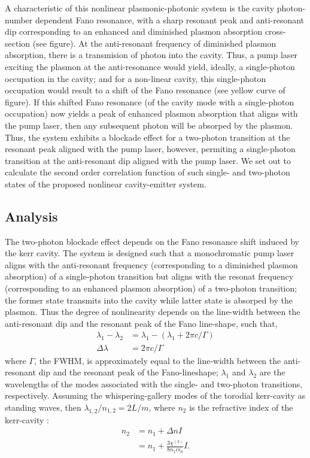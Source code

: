 \documentclass[12pt]{article}
\begin{document}
A characteristic of this nonlinear plasmonic-photonic system is the cavity photon-number 
dependent Fano resonance, with a sharp resonant peak and anti-resonant dip corresponding 
to an enhanced and diminished plasmon absorption cross-section (see figure). At the 
anti-resonant frequency of diminished plasmon absorption, there is a transmision of 
photon into the cavity. Thus, a pump laser exciting the plasmon at the anti-resonance 
would yield, ideally, a single-photon occupation in the cavity; and for a non-linear 
cavity, this single-photon occupation would result to a shift of the Fano resonance
(see yellow curve of figure). If this shifted Fano resonance (of the cavity mode with 
a single-photon occupation) now yields a peak of enhanced plasmon absorption that aligns 
with the pump laser, then any subsequent photon will be absorped by the plasmon. Thus, 
the system exhibits a blockade effect for a two-photon transition at the resonant peak
aligned with the pump laser, however, permiting a single-photon transition at the 
anti-resonant dip aligned with the pump laser. We set out to calculate the second order 
correlation function of such single- and two-photon states of the proposed nonlinear 
cavity-emitter system.

\subsection{Analysis}
The two-photon blockade effect depends on the Fano resonance shift induced by the kerr 
cavity. The system is designed such that a monochromatic pump laser aligns with the 
anti-resonant frequency (corresponding to a diminished plasmon absorption) of a 
single-photon transition but aligns with the resonat frequency (corresponding to an 
enhanced plasmon absorption) of a two-photon transition; the former state transmits into 
the cavity while latter state is absorped by the plasmon. Thus the degree of nonlinearity 
depends on the line-width between the anti-resonant dip and the resonant peak of the 
Fano line-shape, such that,
\begin{equation}
\begin{split}
\lambda_1 - \lambda_2 &= \lambda_1 - (\lambda_1 + 2\pi c / \Gamma )
\\
\Delta\lambda &= 2\pi c / \Gamma
\end{split}
\end{equation}
where $\Gamma$, the FWHM, is approximately equal to the line-width between the 
anti-resonant dip and the resonant peak of the Fano-lineshape; $\lambda_1$ and 
$\lambda_2$ are the wavelengths of the modes associated with the single- and two-photon
transitions, respectively.  Assuming the whispering-gallery modes of the torodial 
kerr-cavity as standing waves, then $\lambda_{1,2}/n_{1,2} = 2L/m$, where $n_2$
is the refractive index of the kerr-cavity \cite{spillane2002ultralow}:
\begin{equation}
\begin{split}
n_2 &= n_1 + \Delta n I
\\
&= n_1 + \frac{3 \chi^{(3)}}{8 n_1 c\epsilon_0} I.
\end{split}
\end{equation}
\end{document}
